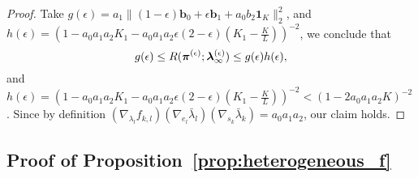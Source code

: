 \begin{proof}
Take $g(\epsilon)=a_1\|(1-\epsilon)\bm{b}_0 + \epsilon \bm{b}_1+ a_0 b_2 \bm{1}_K\|_2^2$, and $h(\epsilon)=\left(1-a_0a_1a_2K_1- a_0a_1a_2\epsilon(2-\epsilon)\left(K_1-\frac{K}{L}\right)\right)^{-2}$, we conclude that  
$$g(\epsilon)\leq R(\bm{\pi}^{(\epsilon)}; \bm{\lambda}_{\infty}^{(\epsilon)})\leq g(\epsilon)h(\epsilon),$$
and $h(\epsilon)=\left(1-a_0a_1a_2K_1- a_0a_1a_2\epsilon(2-\epsilon)\left(K_1-\frac{K}{L}\right)\right)^{-2}<(1-2a_0a_1a_2K)^{-2}$. Since by definition $(\nabla_{\lambda_l} f_{k,l})(\nabla_{e_l} \bar{\lambda}_l) (\nabla_{s_k} \bar{\lambda}_k)=a_0a_1a_2$, our claim holds.
\end{proof}

\subsection{Proof of Proposition~\ref{prop:heterogeneous_f}} \label{proof:heterogeneous_f}
